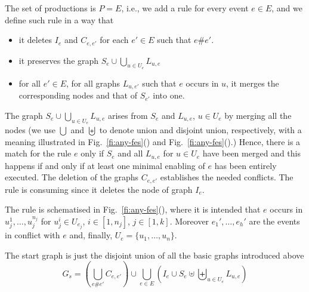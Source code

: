 \documentclass[conference]{IEEEtran}
\newcommand{\full}[1]{}
\newcommand{\full}[1]{{#1}}
\newcommand{\pmin}[1]{\ensuremath{U_{#1}}}
\newcommand{\interval}[2][1]{\ensuremath{[{#1},{#2}]}}
\begin{document}
The set of productions is $P = E$, i.e., we add a rule for every event $e \in E$, and we define such rule in a way that
\begin{itemize}

\item it deletes $I_e$ and  $C_{e,e'}$ for each $e' \in E$ such that $e \# e'$.
\item it preserves the graph $S_e \cup \bigcup_{u \in U_e} L_{u,e}$ 

\item for all $e' \in E$, for all graphs $L_{u,e'}$ such that
  $e$ occurs in $u$, it merges the corresponding nodes and that of $S_{e'}$ into one.

\end{itemize}
The graph $S_e \cup \bigcup_{u \in U_e} L_{u,e}$ arises from $S_e$ and
$L_{u,e}$, $u \in \pmin{e}$ by merging all the nodes (we use $\bigcup$
and $\biguplus$ to denote union and disjoint union, respectively, with
a meaning illustrated in Fig.~\ref{fi:any-fes}()
and Fig.~\ref{fi:any-fes}().) Hence, there is a match for the
rule $e$ only if $S_e$ and all $L_{u,e}$ for $u \in \pmin{e}$ have been merged
and this happens if and only if at least one minimal enabling of $e$
has been entirely executed.  The deletion of the graphs $C_{e,e'}$ establishes the
needed conflicts. The rule is consuming since it deletes the node of graph
$I_e$.
%
\full{
Formally, the rule for $e$ has as left-hand side the graph
\[
  I_e \cup 
  (\bigcup_{\substack{e' \in E\\ e\#e'}} C_{e,e'}) \cup
  (\bigcup_{e' \in E} (S_{e'} \uplus \biguplus_{\substack{\ u'\in\pmin{e'}\\e \in u'}} L_{u',e'})) 
  \cup (S_e \cup \bigcup_{u \in \pmin{e}} L_{u,e}) 
\]
while the right-hand side is
\[
  (S_e \cup \bigcup_{u \in \pmin{e}} L_{u,e}) 
  \cup
  (\bigcup_{e' \in E} (S_{e'} \cup \bigcup_{\substack{\ u'\in\pmin{e'}\\e \in u'}} L_{u',e'}))
\]
}
%
The rule is schematised in
Fig.~\ref{fi:any-fes}(), where it is intended
that $e$ occurs in $u_j^1, \ldots, u_j^{n_j}$ for $u_j^i \in U_{e_j}$,
$i \in \interval{n_j}$, $j \in \interval{k}$. Moreover
$e_1', \ldots, e_h'$ are the events in conflict with $e$ and, finally,
$U_e = \{ u_1, \ldots, u_n \}$.


The start graph is just the disjoint union of all the basic graphs
introduced above
\[
  G_s = (\bigcup_{e\#e'} C_{e,e'}) \cup
  \bigcup_{e \in E}  (I_e \cup S_e \uplus \biguplus_{u \in U_e} L_{u,e})
\]
\end{document}
